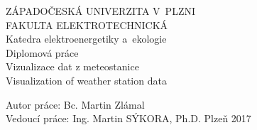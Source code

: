 \documentclass[oneside,12pt,a4paper,final]{report} %
\begin{document}
\pagestyle{empty}
\begin{titlepage}
\noindent
\begin{center}
	{\LARGE ZÁPADOČESKÁ UNIVERZITA V~PLZNI} \\[0.1cm]
	{\LARGE FAKULTA ELEKTROTECHNICKÁ} \\[0.4cm]
	{\Large\sc Katedra elektroenergetiky a~ekologie} \\
	\vspace{5cm}
	{\Huge\sc Diplomová práce} \\
	\vspace{1cm}
	{\large Vizualizace dat z meteostanice\\}
	\vspace{1cm}
	{\large Visualization of weather station data}
\end{center}
\vfill
Autor práce: Bc. Martin Zlámal\\
Vedoucí práce: Ing. Martin SÝKORA, Ph.D. \hfill Plzeň 2017
\end{titlepage}

\pagestyle{plain}

%
%





\tableofcontents
\cleardoublepage
{}
{}
\listoffigures








\end{document}
